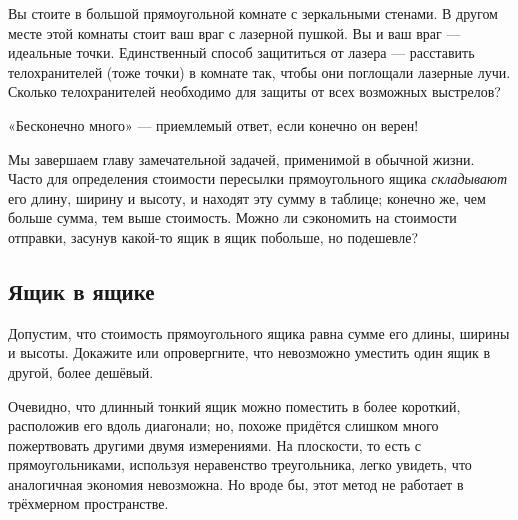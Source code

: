 Вы стоите в большой прямоугольной комнате с зеркальными стенами.
В другом месте этой комнаты стоит ваш враг с лазерной пушкой.
Вы и ваш враг --- идеальные точки.
Единственный способ защититься от лазера --- расставить телохранителей (тоже точки) в комнате так, чтобы они поглощали лазерные лучи.
Сколько телохранителей необходимо для защиты от всех возможных выстрелов?

 «Бесконечно много» --- приемлемый ответ, если конечно он верен!

\medskip

Мы завершаем главу замечательной задачей, применимой в обычной жизни.
Часто для определения стоимости пересылки прямоугольного ящика \emph{складывают} его длину, ширину и высоту,
и находят эту сумму в таблице;
конечно же, чем больше сумма, тем выше стоимость.
Можно ли сэкономить на стоимости отправки, засунув какой-то ящик в ящик побольше, но подешевле?

\subsection*{Ящик в ящике}\label{Ящик в ящике}


Допустим, что стоимость прямоугольного ящика равна сумме его длины, ширины и высоты.
Докажите или опровергните, что невозможно уместить один ящик в другой, более дешёвый.

Очевидно, что длинный тонкий ящик можно поместить в более короткий, расположив его вдоль диагонали;
но, похоже придётся слишком много пожертвовать другими двумя измерениями.
На плоскости, то есть с прямоугольниками, используя неравенство треугольника, легко увидеть, что аналогичная экономия невозможна.
Но вроде бы, этот метод не работает в трёхмерном пространстве.
